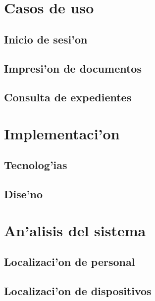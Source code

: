 \documentclass[a4paper,12pt]{article}
\begin{document}
\pagebreak

\index \section{Casos de uso}

	\subsection{Inicio de sesi'on}
		

	\subsection{Impresi'on de documentos}
		

	\subsection{Consulta de expedientes}
				

\pagebreak

\section{Implementaci'on}

	\subsection{Tecnolog'ias}
				

	\subsection{Dise'no}

\pagebreak

\section{An'alisis del sistema}

	\index \subsection{Localizaci'on de personal}
		

	\subsection{Localizaci'on de dispositivos}
		
\end{document}
